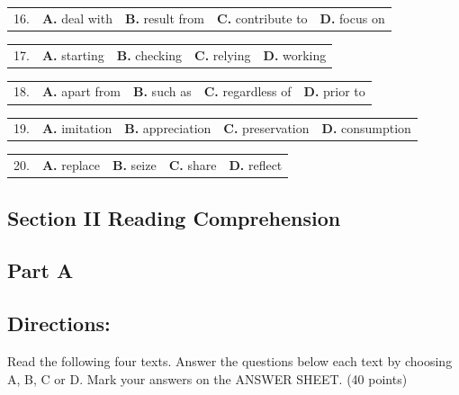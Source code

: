 \documentclass[UTF8,11pt]{ctexart}
\begin{document}
\noindent\begin{tabularx}{\linewidth}{@{}lXXXX@{}}16. & \textbf{A.} deal with & \textbf{B.} result from & \textbf{C.} contribute to & \textbf{D.} focus on\\\end{tabularx}\par

\noindent\begin{tabularx}{\linewidth}{@{}lXXXX@{}}17. & \textbf{A.} starting & \textbf{B.} checking & \textbf{C.} relying & \textbf{D.} working\\\end{tabularx}\par

\noindent\begin{tabularx}{\linewidth}{@{}lXXXX@{}}18. & \textbf{A.} apart from & \textbf{B.} such as & \textbf{C.} regardless of & \textbf{D.} prior to\\\end{tabularx}\par

\noindent\begin{tabularx}{\linewidth}{@{}lXXXX@{}}19. & \textbf{A.} imitation & \textbf{B.} appreciation & \textbf{C.} preservation & \textbf{D.} consumption\\\end{tabularx}\par

\noindent\begin{tabularx}{\linewidth}{@{}lXXXX@{}}20. & \textbf{A.} replace & \textbf{B.} seize & \textbf{C.} share & \textbf{D.} reflect\\\end{tabularx}\par

\subsection*{\textbf{Section II Reading Comprehension}}


\subsection*{\textbf{Part A}}


\subsection*{\textbf{Directions:}}


Read the following four texts. Answer the questions below each text by choosing A, B, C or D. Mark your answers on the ANSWER SHEET. (40 points)
\end{document}
